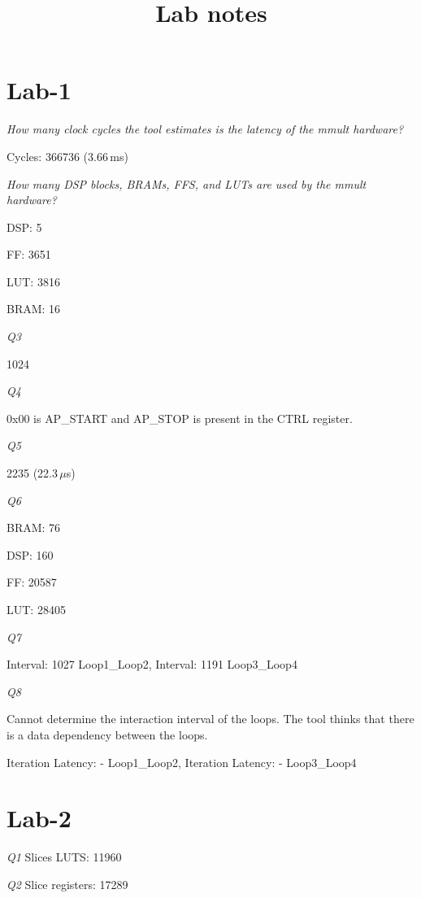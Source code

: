 \documentclass{article}
\title{Lab notes}
\begin{document}
\maketitle

\section{Lab-1}

\emph{How many clock cycles the tool estimates is the latency of the mmult hardware?}

Cycles: 366736 (3.66\,ms)



\noindent \emph{How many DSP blocks, BRAMs, FFS, and LUTs are used by the mmult hardware?}

DSP: 5

FF: 3651

LUT: 3816

BRAM: 16



\noindent  \emph{Q3}

1024

\noindent  \emph{Q4}

0x00 is \textsf{AP\_START} and \textsf{AP\_STOP} is present in the \textsf{CTRL} register.

\noindent \emph{Q5}

2235 (22.3\,$\mu$s)


\noindent \emph{Q6}

BRAM: 76

DSP: 160

FF: 20587

LUT: 28405


\noindent \emph{Q7}

Interval: 1027 \textsf{Loop1\_Loop2}, Interval: 1191 \textsf{Loop3\_Loop4}


\noindent \emph{Q8}

Cannot determine the interaction interval of the loops. The tool thinks that there is a data dependency between the loops. 

Iteration Latency: - \textsf{Loop1\_Loop2}, Iteration Latency: - \textsf{Loop3\_Loop4}

\newpage

\section{Lab-2} 

\emph{Q1} Slices LUTS: 11960

\emph{Q2} Slice registers: 17289
\end{document}
